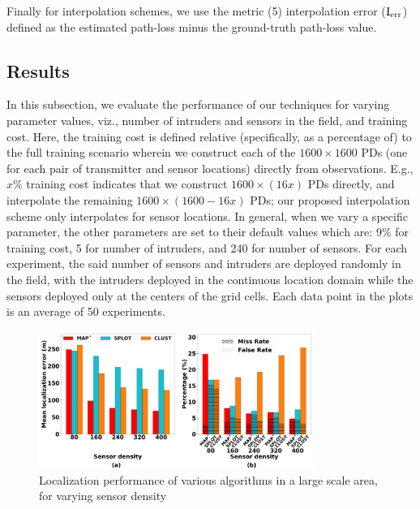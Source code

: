 Finally for interpolation schemes, we use the metric (5) interpolation error ($\mathrm{I_{err}}$) defined as the estimated path-loss minus the ground-truth path-loss value.

\subsection{Results}

In this subsection, we evaluate the performance of our techniques for
varying parameter values, viz., number of intruders and sensors in the
field, and training cost.
Here, the training cost is defined relative (specifically, as a
percentage of) to the full training scenario wherein we construct each
of the $1600 \times 1600$ PDs (one for each pair of transmitter and
sensor locations) directly from observations. E.g., $x\%$ training
cost indicates that we construct $1600 \times (16x)$ PDs directly, and
interpolate the remaining $1600 \times (1600-16x)$ PDs; our proposed
interpolation scheme only interpolates for sensor locations.
In general, when we vary a specific parameter, the other parameters
are set to their default values which are: 9\% for training
cost, 5 for number of intruders, and 240 for number of sensors.
For each experiment, the said number of sensors and intruders are
deployed randomly in the field, with the intruders deployed in the
continuous location domain while the sensors deployed only at the
centers of the grid cells. Each data point in the plots is an
average of 50 experiments.

\begin{figure}[ht]
	\centering
	\includegraphics[width=0.8\textwidth]{chapters/ipsn/figures/splat-vary-sendensity.png}
	\caption{Localization performance of various algorithms in a large scale area, for varying sensor density}
	\label{fig:varying-num-sendensity}
\end{figure}

